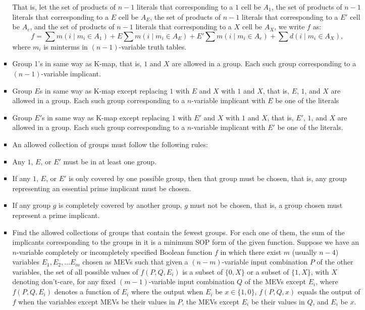 \documentclass[a4paper,12pt]{article}
\begin{document}
\begin{itemize}
\begin{itemize}
\begin{itemize}
\begin{itemize}
\begin{itemize}
\begin{itemize}
\begin{itemize}
\eit
That is, let the set of products of $n-1$ literals that corresponding to a $1$ cell be $A_1$, the set of products of $n-1$ literals that corresponding to a $E$ cell be $A_E$, the set of products of $n-1$ literals that corresponding to a $E'$ cell be $A_e$, and the set of products of $n-1$ literals that corresponding to a $X$ cell be $A_X$, we write $f$ as:
\[f=\sum m(i\mid m_i\in A_1)+E\sum m(i\mid m_i\in A_E)+E'\sum m(i\mid m_i\in A_e)+\sum d(i\mid m_i\in A_X),\]
where $m_i$ is minterms in $(n-1)$-variable truth tables.
\item Group 1's in same way as K-map, that is, $1$ and $X$ are allowed in a group. Each such group corresponding to a $(n-1)$-variable implicant.
\item Group $E$s in same way as K-map except replacing $1$ with $E$ and $X$ with $1$ and $X$, that is, $E$, $1$, and $X$ are allowed in a group. Each such group corresponding to a $n$-variable implicant with $E$ be one of the literals
\item Group $E'$s in same way as K-map except replacing $1$ with $E'$ and $X$ with $1$ and $X$, that is, $E'$, $1$, and $X$ are allowed in a group. Each such group corresponding to a $n$-variable implicant with $E'$ be one of the literals.
\item An allowed collection of groups must follow the following rules:
\bit
\item Any $1$, $E$, or $E'$ must be in at least one group.
\item If any $1$, $E$, or $E'$ is only covered by one possible group, then that group must be chosen, that is, any group representing an essential prime implicant must be chosen.
\item If any group $g$ is completely covered by another group, $g$ must not be chosen, that is, a group chosen must represent a prime implicant.
\eit
\item Find the allowed collections of groups that contain the fewest groups. For each one of them, the sum of the implicants corresponding to the groups in it is a minimum SOP form of the given function.
\een
{}
Suppose we have an $n$-variable completely or incompletely specified Boolean function $f$ in which there exist $m$ (usually $n-4$) variables $E_1,E_2,\ldots E_m$ chosen as MEVs such that given a $(n-m)$-variable input combination $P$ of the other variables, the set of all possible values of $f(P,Q,E_i)$ is a subset of $\{0,X\}$ or a subset of $\{1,X\}$, with $X$ denoting don't-care, for any fixed $(m-1)$-variable input combination $Q$ of the MEVs except $E_i$, where $f(P,Q,E_i)$ denotes a function of $E_i$ where the output when $E_i$ be $x\in\{1,0\}$, $f(P,Q,x)$ equals the output of $f$ when the variables except MEVs be their values in $P$, the MEVs except $E_i$ be their values in $Q$, and $E_i$ be $x$.

\end{itemize}
\end{itemize}
\end{itemize}
\end{itemize}
\end{itemize}
\end{itemize}
\end{itemize}
\end{document}
